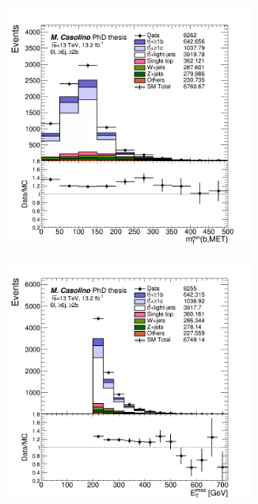 \begin{figure}[p]
\begin{subfigure}{0.33\textwidth}
  \caption{}
  \label{}
\end{subfigure}
\begin{subfigure}{0.33\textwidth}
  \centering
  \includegraphics[width=0.9\textwidth]{figures/VLQ/presel/0lep/canv_c0l2b_mtbmin.png}
  \caption{}
  \label{}
\end{subfigure}
\begin{subfigure}{0.33\textwidth}
  \centering
  \includegraphics[width=0.9\textwidth]{figures/VLQ/presel/0lep/canv_c0l2b_met.png}

\end{subfigure}
\end{figure}
